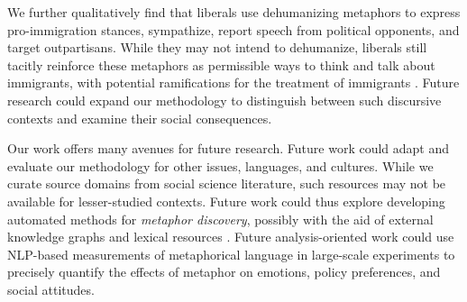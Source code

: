 We further qualitatively find that liberals use dehumanizing metaphors to express pro-immigration stances, sympathize, report speech from political opponents, and target outpartisans.
While they may not intend to dehumanize, liberals still tacitly reinforce these metaphors as permissible ways to think and talk about immigrants, with potential ramifications for the treatment of immigrants \citep{el2001metaphors}. Future research could expand our methodology to distinguish between such discursive contexts and examine their social consequences.

Our work offers many avenues for future research. 
Future work could adapt and evaluate our methodology for other issues, languages, and cultures. While we curate source domains from social science literature, such resources may not be available for lesser-studied contexts. Future work could thus explore developing automated methods for \textit{metaphor discovery}, possibly with the aid of external knowledge graphs and lexical resources \citep{mao_metapro_2022,mao_metapro_2023}. Future analysis-oriented work could use NLP-based measurements of metaphorical language in large-scale experiments to precisely quantify the effects of metaphor on emotions, policy preferences, and social attitudes. 








